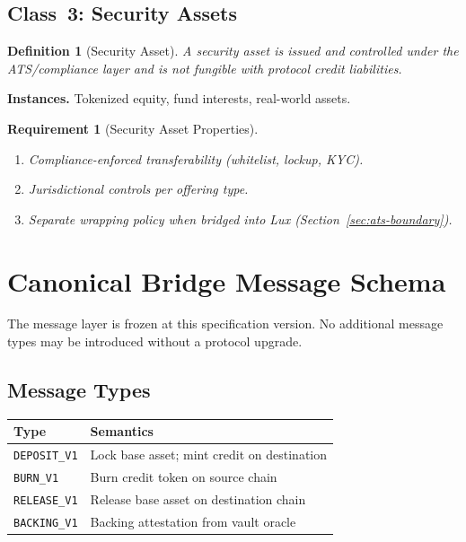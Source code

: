 \documentclass[11pt,twocolumn]{article}
\newtheorem{definition}{Definition}[section]
\newtheorem{requirement}{Requirement}[section]
\theoremstyle{remark}
\begin{document}
\subsection{Class~3: Security Assets}
\label{sec:security}

\begin{definition}[Security Asset]
A security asset is issued and controlled under the ATS/compliance layer and is not fungible with protocol credit liabilities.
\end{definition}

\noindent\textbf{Instances.} Tokenized equity, fund interests, real-world assets.

\begin{requirement}[Security Asset Properties]
\label{req:security}
\begin{enumerate}[nosep]
  \item Compliance-enforced transferability (whitelist, lockup, KYC).
  \item Jurisdictional controls per offering type.
  \item Separate wrapping policy when bridged into Lux (Section~\ref{sec:ats-boundary}).
\end{enumerate}
\end{requirement}


\section{Canonical Bridge Message Schema}
\label{sec:messages}

The message layer is frozen at this specification version. No additional message types may be introduced without a protocol upgrade.

\subsection{Message Types}

\begin{center}
\begin{tabular}{@{}ll@{}}
\toprule
\textbf{Type} & \textbf{Semantics} \\
\midrule
\texttt{DEPOSIT\_V1}  & Lock base asset; mint credit on destination \\
\texttt{BURN\_V1}     & Burn credit token on source chain \\
\texttt{RELEASE\_V1}  & Release base asset on destination chain \\
\texttt{BACKING\_V1}  & Backing attestation from vault oracle \\
\bottomrule
\end{tabular}
\end{center}
\end{document}
